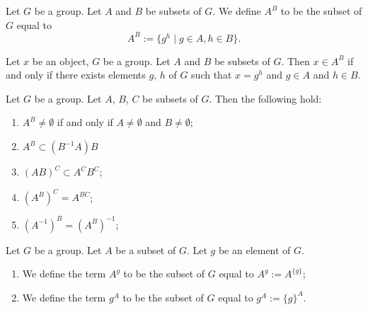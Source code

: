 \begin{definition}
Let $G$ be a group. Let $A$ and $B$ be subsets of $G$.
We define $A^{B}$ to be the subset of $G$ equal to
\begin{equation}
A^{B}:=\{g^{h}\mid g\in A,h\in B\}.
\end{equation}
\end{definition}

\begin{theorem}
Let $x$ be an object, $G$ be a group. Let $A$ and $B$ be subsets of $G$.
Then $x\in A^{B}$ if and only if there exists elements $g$, $h$ of $G$
such that $x=g^{h}$ and $g\in A$ and $h\in B$.
\end{theorem}

\begin{theorem}
Let $G$ be a group. Let $A$, $B$, $C$ be subsets of $G$. Then the
following hold:
\begin{enumerate}
\item{} $A^{B}\neq\emptyset$ if and only if
  $A\neq\emptyset$ and $B\neq\emptyset$;
\item{} $A^{B}\subset (B^{-1}A)B$
\item{} $(AB)^{C}\subset A^{C}B^{C}$;
\item{} $(A^{B})^{C}=A^{BC}$;
\item{} $(A^{-1})^{B}=(A^{B})^{-1}$;
\end{enumerate}
\end{theorem}

\begin{definition}
Let $G$ be a group. Let $A$ be a subset of $G$. Let $g$ be an element
of $G$.
\begin{enumerate}
\item{} We define the term $A^{g}$ to be the subset
  of $G$ equal to $A^{g} := A^{\{g\}}$;
\item{} We define the term $g^{A}$ to be the subset
  of $G$ equal to $g^{A} := \{g\}^{A}$.
\end{enumerate}
\end{definition}

